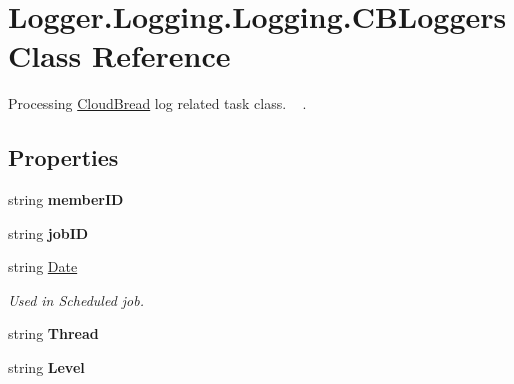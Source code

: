 \hypertarget{a00028}{}\section{Logger.\+Logging.\+Logging.\+C\+B\+Loggers Class Reference}
\label{a00028}


Processing \hyperlink{a00217}{Cloud\+Bread} log related task class. ~\newline
.  


\subsection*{Properties}
\begin{DoxyCompactItemize}
\item 
string {\bfseries member\+ID}\hypertarget{a00028_ab2597ad25d951047f6f25d5588e3917f}{}\label{a00028_ab2597ad25d951047f6f25d5588e3917f}

\item 
string {\bfseries job\+ID}\hypertarget{a00028_a300e1f3da308fd2657ffa01cfd0dcdd0}{}\label{a00028_a300e1f3da308fd2657ffa01cfd0dcdd0}

\item 
string \hyperlink{a00028_ae97b8575647e6ee056ac52371cac1ec7}{Date}\hypertarget{a00028_ae97b8575647e6ee056ac52371cac1ec7}{}\label{a00028_ae97b8575647e6ee056ac52371cac1ec7}

\begin{DoxyCompactList}\small\item\em Used in Scheduled job. \end{DoxyCompactList}\item 
string {\bfseries Thread}\hypertarget{a00028_a1e1e507072ea458391b26cd8f4972ed5}{}\label{a00028_a1e1e507072ea458391b26cd8f4972ed5}

\item 
string {\bfseries Level}\hypertarget{a00028_a7118ce5feee0acfefd006b151f5e9424}{}\label{a00028_a7118ce5feee0acfefd006b151f5e9424}


\end{DoxyCompactItemize}
